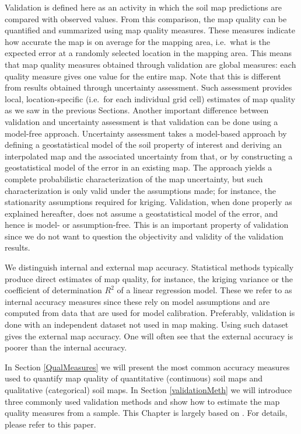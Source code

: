 \documentclass[10pt,b5paper,]{book}
\theoremstyle{definition}
\theoremstyle{definition}
\theoremstyle{definition}
\theoremstyle{remark}
\begin{document}
Validation is defined here as an activity in which the soil map
predictions are compared with observed values. From this comparison, the
map quality can be quantified and summarized using map quality measures.
These measures indicate how accurate the map is on average for the
mapping area, i.e.~what is the expected error at a randomly selected
location in the mapping area. This means that map quality measures
obtained through validation are global measures: each quality measure
gives one value for the entire map. Note that this is different from
results obtained through uncertainty assessment. Such assessment
provides local, location-specific (i.e.~for each individual grid cell)
estimates of map quality as we saw in the previous Sections. Another
important difference between validation and uncertainty assessment is
that validation can be done using a model-free approach. Uncertainty
assessment takes a model-based approach by defining a geostatistical
model of the soil property of interest and deriving an interpolated map
and the associated uncertainty from that, or by constructing a
geostatistical model of the error in an existing map. The approach
yields a complete probabilistic characterization of the map uncertainty,
but such characterization is only valid under the assumptions made; for
instance, the stationarity assumptions required for kriging. Validation,
when done properly as explained hereafter, does not assume a
geostatistical model of the error, and hence is model- or
assumption-free. This is an important property of validation since we do
not want to question the objectivity and validity of the validation
results.

We distinguish internal and external map accuracy. Statistical methods
typically produce direct estimates of map quality, for instance, the
kriging variance or the coefficient of determination \(R^2\) of a linear
regression model. These we refer to as internal accuracy measures since
these rely on model assumptions and are computed from data that are used
for model calibration. Preferably, validation is done with an
independent dataset not used in map making. Using such dataset gives the
external map accuracy. One will often see that the external accuracy is
poorer than the internal accuracy.

In Section \ref{QualMeasures} we will present the most common accuracy
measures used to quantify map quality of quantitative (continuous) soil
maps and qualitative (categorical) soil maps. In Section
\ref{validationMeth} we will introduce three commonly used validation
methods and show how to estimate the map quality measures from a sample.
This Chapter is largely based on \citet{brus2011sampling}. For details,
please refer to this paper.
\end{document}
